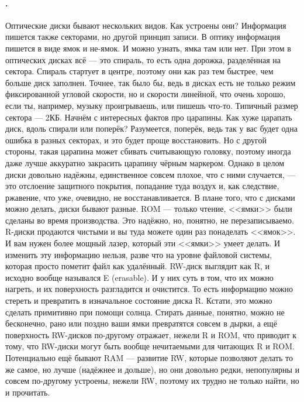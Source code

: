 \documentclass{article}
\begin{document}
    \paragraph{.}
    Оптические диски бывают нескольких видов. Как устроены они? Информация пишется также секторами, но другой принцип записи. В оптику информация пишется в виде ямок и не-ямок. И можно узнать, ямка там или нет. При этом в оптических дисках всё --- это спираль, то есть одна дорожка, разделённая на сектора. Спираль стартует в центре, поэтому они как раз тем быстрее, чем больше диск заполнен. Точнее, так было бы, ведь в дисках есть не только режим фиксированной угловой скорости, но и скорости линейной, что очень хорошо, если ты, например, музыку проигрываешь, или пишешь что-то. Типичный размер сектора --- 2КБ. Начнём с интересных фактов про царапины. Как хуже царапать диск, вдоль спирали или поперёк? Разумеется, поперёк, ведь так у вас будет одна ошибка в разных секторах, и это будет проще восстановить. Но с другой стороны, такая царапина может сбивать считывающую головку, поэтому иногда даже лучше аккуратно закрасить царапину чёрным маркером. Однако в целом диски довольно надёжны, единственное совсем плохое, что с ними случается, --- это отслоение защитного покрытия, попадание туда воздух и, как следствие, ржавение, что уже, очевидно, не восстанавливается. В плане того, что с дисками можно делать, диски бывают разные. ROM --- только чтение, <<ямки>> были сделаны во время производства. Это надёжно, но, понятно, не перезаписываемо. R-диски продаются чистыми и вы туда можете один раз понаделать <<ямок>>. И вам нужен более мощный лазер, который эти <<ямки>> умеет делать. И изменить эту информацию нельзя, разве что на уровне файловой системы, которая просто пометит файл как удалённый. RW-диск выглядит как R, и исходно вообще назывался E (erasable). И у них суть в том, что их можно нагреть, и их поверхность разгладится и очистится. То есть информацию можно стереть и превратить в изначальное состояние диска R. Кстати, это можно сделать примитивно при помощи солнца. Стирать данные, понятно, можно не бесконечно, рано или поздно ваши ямки превратятся совсем в дырки, а ещё поверхность RW-дисков по-другому отражает, нежели R и ROM, что приводит к тому, что RW-диски могут быть вообще нечитаемыми для читающих R и ROM. Потенциально ещё бывают RAM --- развитие RW, которые позволяют делать то же самое, но лучше (надёжнее и дольше), но они довольно редки, непопулярны и совсем по-другому устроены, нежели RW, поэтому их трудно не только найти, но и прочитать.\\
\end{document}

